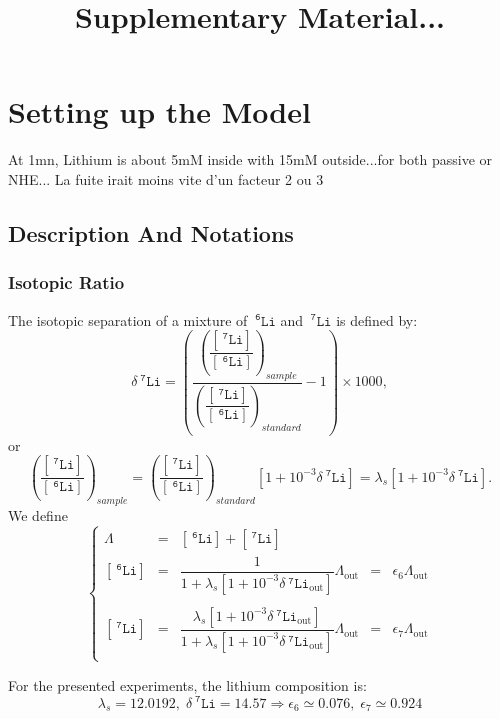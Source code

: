 \documentclass[aps,onecolumn,11pt]{revtex4}
\newcommand{\mychem}[1]{\mathtt{#1}}
\newcommand{\myconc}[1]{\left\lbrack{#1}\right\rbrack}
\newcommand{\spLi}[1]{{~^{\mychem{#1}}\mychem{Li}}}
\newcommand{\Li}[1]{\myconc{\spLi{#1}}}
\newcommand{\deltaLi}{ {\delta\!\!\!\spLi{7}} }
\newcommand{\deltaLiOut}{{\deltaLi}_{\mathrm{out}}}
\newcommand{\LiAll}{\Lambda}
\newcommand{\LiAllOut}{{\LiAll}_{\mathrm{out}}}
\begin{document}
\title{Supplementary Material...}
\maketitle

\section{Setting up the Model}
At 1mn, Lithium is about 5mM inside with 15mM outside...for both passive or NHE...
La fuite irait moins vite d'un facteur 2 ou 3

\subsection{Description And Notations}

\subsubsection{Isotopic Ratio}
The isotopic separation of a mixture of $\spLi{6}$ and $\spLi{7}$ is defined by:
\begin{equation}
	\deltaLi = \left(
		\dfrac{\left(\dfrac{\Li{7}}{\Li{6}}\right)_{sample}}
		{\left(\dfrac{\Li{7}}{\Li{6}}\right)_{standard}}
		 -1 
	\right) \times 1000,
\end{equation}
or
\begin{equation}
	\left(\dfrac{\Li{7}}{\Li{6}}\right)_{sample} = \left(\dfrac{\Li{7}}{\Li{6}}\right)_{standard} \left[1+10^{-3}\deltaLi\right] = \lambda_s \left[1+10^{-3}\deltaLi\right].
\end{equation}
We define
\begin{equation}
\left\lbrace
\begin{array}{rclcl}
	\LiAll & = & \Li{6} + \Li{7}\\
	\Li{6} & = & \dfrac{1}{1+\lambda_s \left[1+10^{-3}\deltaLiOut\right] } \LiAllOut & = & \epsilon_6 \LiAllOut   \\
	\\
	\Li{7} & = & \dfrac{\lambda_s \left[1+10^{-3}\deltaLiOut\right]}{1+\lambda_s \left[1+10^{-3}\deltaLiOut\right] } \LiAllOut & = & \epsilon_7 \LiAllOut\\
\end{array}
\right.
\end{equation}

For the presented experiments, the lithium composition is:
\begin{equation}
	\lambda_s = 12.0192, \; \deltaLi = 14.57 \Rightarrow \epsilon_6 \simeq 0.076,\;\epsilon_7 \simeq 0.924
\end{equation}
\end{document}
